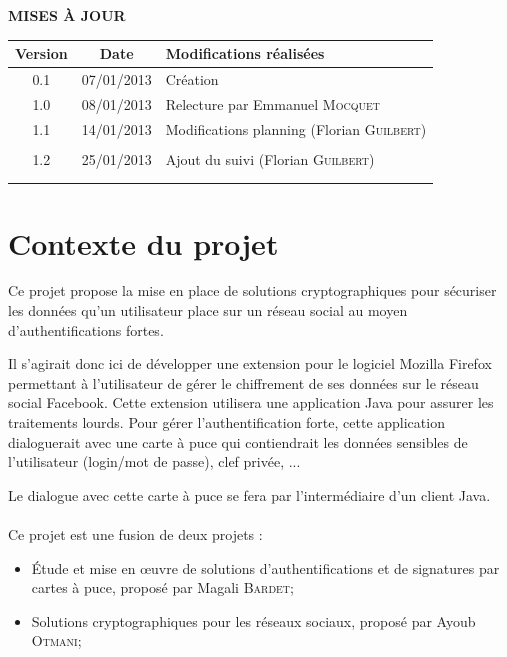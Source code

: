 \documentclass[a4paper,11pt,french]{article}
\begin{document}
\makeFirstPage
\clearpage

\vspace*{1cm}
\begin{center}
\textbf{\huge{MISES À JOUR}}\\
\vspace*{3cm}
	\begin{tabularx}{16cm}{|c|c|X|}
	\hline
	\bfseries{Version} & \bfseries{Date} & \bfseries{Modifications réalisées}\\
	\hline
	0.1 & 07/01/2013 & Création\\
	\hline
	1.0 & 08/01/2013 & Relecture par Emmanuel \textsc{Mocquet}\\
	\hline
	1.1 & 14/01/2013 & Modifications planning (Florian \textsc{Guilbert})\\
	\hline
	&&\\
	1.2 & 25/01/2013 & Ajout du suivi (Florian \textsc{Guilbert})\\
	\hline
	&&\\
	\hline
	&&\\
	\hline
	\end{tabularx}
\end{center}

\clearpage
\tableofcontents
\clearpage

\section{Contexte du projet}
Ce projet propose la mise en place de solutions cryptographiques pour sécuriser
les données qu'un utilisateur place sur un réseau social au moyen  
d'authentifications fortes.

Il s'agirait donc ici de développer une extension pour le logiciel
Mozilla Firefox permettant à l'utilisateur de gérer le chiffrement de 
ses données sur le réseau social Facebook. Cette extension utilisera une 
application Java pour assurer les traitements lourds. Pour gérer 
l'authentification forte, cette application dialoguerait avec une carte à 
puce qui contiendrait les données sensibles de l'utilisateur 
(login/mot de passe), clef privée, ...

Le dialogue avec cette carte à puce se fera par l'intermédiaire d'un
client Java.

\paragraph{}
Ce projet est une fusion de deux projets :
\begin{itemize}
    \item Étude et mise en \oe{}uvre de solutions d'authentifications 
    et de signatures par cartes à puce, proposé par Magali \textsc{Bardet};
    \item Solutions cryptographiques pour les réseaux sociaux, 
    proposé par Ayoub \textsc{Otmani};
\end{itemize}
\end{document}
